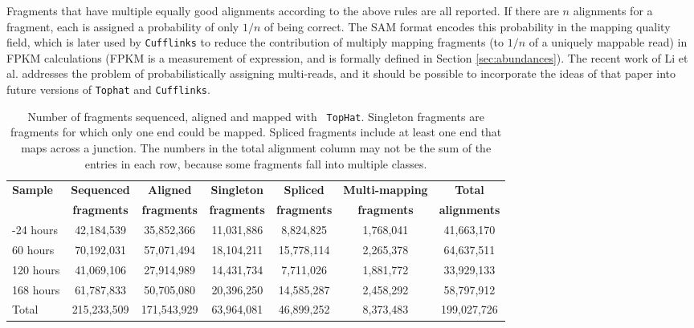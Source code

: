 \documentclass[12pt]{amsart}
\theoremstyle{definition}
\begin{document}
Fragments that have multiple equally good alignments according to the above
rules are all reported. If there are $n$ alignments for a fragment,
each is assigned a probability
of only $1/n$ of being correct. The SAM format encodes this probability in the
mapping quality field, which is later used by {\tt Cufflinks} to reduce the
contribution of multiply mapping fragments (to $1/n$ of a uniquely
mappable read) in FPKM calculations (FPKM is a measurement of
expression, and is formally defined in Section
\ref{sec:abundances}). The recent work of Li et al. \cite{Li2009b}
addresses the problem of probabilistically assigning multi-reads, and
it should be possible to incorporate the ideas of that paper into
future versions of {\tt Tophat} and {\tt Cufflinks}. 

\begin{table}[h]{
    \Small
    \label{table:reads}
    \begin{tabular}{l|c|c|c|c|c|c} 
        \hline
        \textbf{Sample} & \textbf{Sequenced} & \textbf{Aligned} & \textbf{Singleton} & \textbf{Spliced} & \textbf{Multi-mapping} & \textbf{Total} \\
        & \textbf{fragments} & \textbf{fragments} & \textbf{fragments} & \textbf{fragments} & \textbf{fragments} & \textbf{alignments} \\
        \hline

        -24 hours & 42,184,539 & 35,852,366 & 11,031,886 & 8,824,825 & 1,768,041 & 41,663,170 \\
        60 hours & 70,192,031 & 57,071,494 & 18,104,211 & 15,778,114 & 	2,265,378 & 64,637,511 \\
        120 hours & 41,069,106 & 27,914,989 & 14,431,734 & 7,711,026 & 1,881,772 & 33,929,133 \\
        168 hours & 61,787,833 & 50,705,080 & 20,396,250 & 14,585,287 & 	2,458,292 &	58,797,912 \\
        Total & 215,233,509 & 171,543,929 & 63,964,081 & 46,899,252 & 8,373,483 & 199,027,726 \\

        \hline
        
    \end{tabular}
    }
\vskip 0.2in
\caption[Number of fragments sequenced, aligned and mapped with {\tt TopHat}]{Number of fragments sequenced, aligned and mapped with {\tt
    TopHat}. Singleton fragments are fragments for which only one end
  could be mapped. Spliced fragments include at least one end that
  maps across a junction. The numbers in the total alignment column
  may not be the sum of the entries in each row, because some fragments
  fall into multiple classes.}
\end{table}
\end{document}
